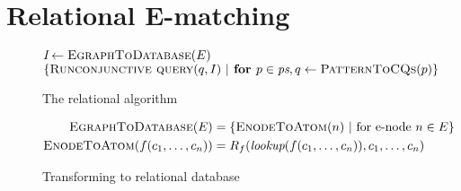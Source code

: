 \chapter{Relational E-matching}


\begin{figure}
    \centering
    \begin{algorithmic}[1]
    \State $\textit{I}\gets \textsc{EgraphToDatabase}(E)$
    \State \Return $\{\textsc{Runconjunctive query}(q, I)\ |\textbf{ for } p\in \textit{ps}, q\gets \textsc{PatternToCQs}(p)\}$
    \EndProcedure
    \end{algorithmic}
    \caption{The relational \ematching algorithm}
    \label{fig:main}
\end{figure}

\begin{figure}
    \centering
    \begin{align*}
        \textsc{EgraphToDatabase}(E) &= \{\textsc{EnodeToAtom}(n)\ |\text{ for \enode\ } n\in E\}\\
        \textsc{EnodeToAtom}(f(c_1,\ldots,c_n)) &= R_f(\textit{lookup}(f(c_1,\ldots,c_n)), c_1,\ldots, c_n)
    \end{align*}
    \caption{Transforming \egraphs to relational database}
    \label{fig:egraph_to_db}
\end{figure}

